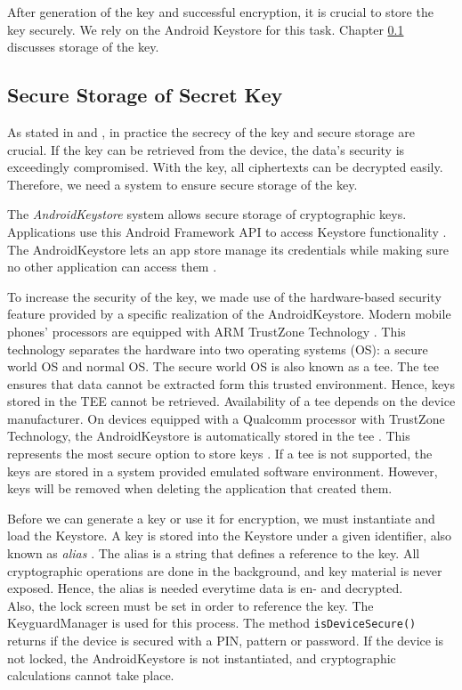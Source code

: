 After generation of the key and successful encryption, it is crucial to store the key securely. We rely on the Android Keystore for this task. Chapter \ref{arch_keystore} discusses storage of the key. \\



\subsection{Secure Storage of Secret Key} \label{arch_keystore}
As stated in \cite{dworkin2007sp} and \cite{CooijmansRP14},  in practice the secrecy of the key and secure storage are crucial. If the key can be retrieved from the device, the data's security is exceedingly compromised. With the key, all ciphertexts can be decrypted easily. Therefore, we need a system to ensure secure storage of the key.

The \textit{AndroidKeystore} system allows secure storage of cryptographic keys. Applications use this Android Framework API  to access Keystore functionality \cite{HWBKeyStore}. The AndroidKeystore lets an app store manage its credentials while making sure no other application can access them \cite{AndroidKeyStoreSystem}.

To increase the security of the key, we made use of the hardware-based security feature provided by a specific realization of the AndroidKeystore. Modern mobile phones' processors are equipped with ARM TrustZone Technology \cite{CooijmansRP14}. This technology separates the hardware into two operating systems (OS): a secure world OS and normal OS. The secure world OS is also known as a \gls{tee}. The \gls{tee} ensures that data cannot be extracted form this trusted environment. Hence, keys stored in the TEE cannot be retrieved. Availability of a \gls{tee} depends on the device manufacturer. On devices equipped with a Qualcomm processor with TrustZone Technology, the AndroidKeystore is automatically stored in the \gls{tee} \cite{CooijmansRP14}. This represents the most secure option to store keys \cite{SecureDataEncryption}. If a \gls{tee} is not supported, the keys are stored in a system provided emulated software environment. However, keys will be removed when deleting the application that created them.

Before we can generate a key or use it for encryption, we must instantiate and load the Keystore. A key is stored into the Keystore under a given identifier, also known as \textit{alias} \cite{CooijmansRP14}. The alias is a string that defines a reference to the key. All cryptographic operations are done in the background, and key material is never exposed. Hence, the alias is needed everytime data is en- and decrypted. \\
Also, the lock screen must be set in order to reference the key. The KeyguardManager is used for this process. The method \texttt{isDeviceSecure()} returns if the device is secured with a PIN, pattern or password. If the device is not locked, the AndroidKeystore is not instantiated, and cryptographic calculations cannot take place. \\



